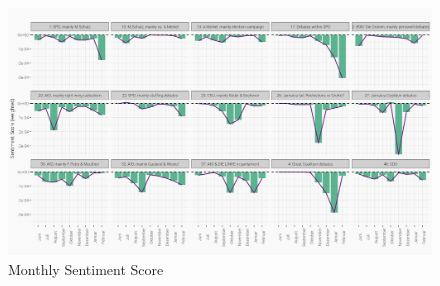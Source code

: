 \documentclass[12pt,a4paper,notitlepage]{article}
\begin{document}
\begin{figure}[H]
	\caption{Monthly Sentiment Score}
		\begin{center}
			\includegraphics[width=\textwidth,keepaspectratio]{../figs/sentscore_monthly.png}
		\end{center}
	\label{fig_sentscore_monthly}
\end{figure}
\end{document}

